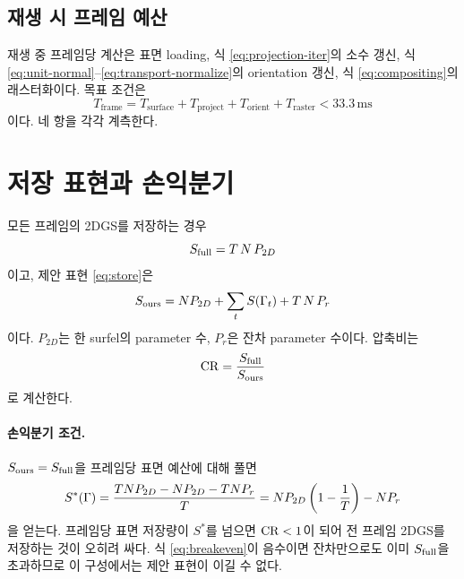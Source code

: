
\subsection{재생 시 프레임 예산}

재생 중 프레임당 계산은 표면 loading, 식 \eqref{eq:projection-iter}의 소수 갱신,
식 \eqref{eq:unit-normal}--\eqref{eq:transport-normalize}의 orientation 갱신, 식
\eqref{eq:compositing}의 래스터화이다. 목표 조건은
\begin{equation}
  T_{\mathrm{frame}} = T_{\mathrm{surface}} + T_{\mathrm{project}}
  + T_{\mathrm{orient}} + T_{\mathrm{raster}} < 33.3\,\mathrm{ms}
  \label{eq:frame-budget}
\end{equation}
이다. 네 항을 각각 계측한다.

\section{저장 표현과 손익분기}
\label{sec:storage-breakeven}

모든 프레임의 2DGS를 저장하는 경우
\begin{equation}
  S_{\mathrm{full}} = T\,N\,P_{2D}
  \label{eq:s-full}
\end{equation}
이고, 제안 표현 \eqref{eq:store}은
\begin{equation}
  S_{\mathrm{ours}} = N P_{2D} + \sum_t S(\Gamma_t) + T\,N\,P_r
  \label{eq:s-ours}
\end{equation}
이다. $P_{2D}$는 한 surfel의 parameter 수, $P_r$은 잔차 parameter 수이다. 압축비는
\begin{equation}
  \mathrm{CR} = \frac{S_{\mathrm{full}}}{S_{\mathrm{ours}}}
  \label{eq:cr}
\end{equation}
로 계산한다.

\paragraph{손익분기 조건.}
$S_{\mathrm{ours}} = S_{\mathrm{full}}$을 프레임당 표면 예산에 대해 풀면
\begin{equation}
  S^{\ast}(\Gamma) = \frac{T N P_{2D} - N P_{2D} - T N P_r}{T}
  = N P_{2D}\left(1 - \frac{1}{T}\right) - N P_r
  \label{eq:breakeven}
\end{equation}
을 얻는다. 프레임당 표면 저장량이 $S^\ast$를 넘으면 $\mathrm{CR}<1$이 되어 전 프레임 2DGS를
저장하는 것이 오히려 싸다. 식 \eqref{eq:breakeven}이 음수이면 잔차만으로도 이미
$S_{\mathrm{full}}$을 초과하므로 이 구성에서는 제안 표현이 이길 수 없다.

